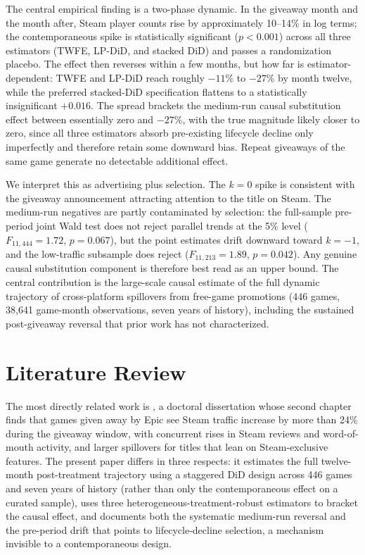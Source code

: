 \documentclass[11pt]{article}
\begin{document}
The central empirical finding is a two-phase dynamic. In the giveaway month and the
month after, Steam player counts rise by approximately 10--14\% in log terms; the
contemporaneous spike is statistically significant ($p<0.001$) across all three
estimators (TWFE, LP-DiD, and stacked DiD) and passes a randomization placebo. The
effect then reverses within a few months, but how far is estimator-dependent: TWFE
and LP-DiD reach roughly $-11\%$ to $-27\%$ by month twelve, while the preferred
stacked-DiD specification flattens to a statistically insignificant $+0.016$. The spread brackets the medium-run causal
substitution effect between essentially zero and $-27\%$, with the true magnitude
likely closer to zero, since all three estimators absorb pre-existing
lifecycle decline only imperfectly and therefore retain some downward bias.
Repeat giveaways of the same game generate no detectable additional effect.

We interpret this as advertising plus selection. The $k = 0$ spike is consistent
with the giveaway announcement attracting attention to the title on Steam. The
medium-run negatives are partly contaminated by selection: the full-sample
pre-period joint Wald test does not reject parallel trends at the 5\% level
($F_{11,444}=1.72$, $p=0.067$), but the point estimates drift downward toward
$k=-1$, and the low-traffic subsample does reject ($F_{11,213}=1.89$, $p=0.042$).
Any genuine causal substitution component is therefore best read as an upper bound.
The central contribution is the large-scale causal estimate of the full dynamic
trajectory of cross-platform spillovers from free-game promotions (446 games,
38{,}641 game-month observations, seven years of history), including the sustained
post-giveaway reversal that prior work has not characterized.

\section{Literature Review}
\label{sec:lit}

The most directly related work is \citet{clarkson2025}, a doctoral dissertation
whose second chapter finds that games given away by Epic see Steam traffic
increase by more than 24\% during the giveaway window, with concurrent rises in
Steam reviews and word-of-mouth activity, and larger spillovers for titles that
lean on Steam-exclusive features. The present paper differs in three respects:
it estimates the full twelve-month post-treatment trajectory using a staggered DiD
design across 446 games and seven years of history (rather than only the
contemporaneous effect on a curated sample), uses three heterogeneous-treatment-robust
estimators to bracket the causal effect, and documents both the systematic medium-run
reversal and the pre-period drift that points to lifecycle-decline selection, a
mechanism invisible to a contemporaneous design. 
\end{document}

